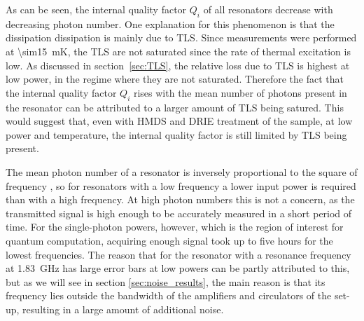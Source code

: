 As can be seen, the internal quality factor $Q_i$ of all resonators decrease with decreasing photon number. One explanation for this phenomenon is that the dissipation dissipation is mainly due to TLS. Since measurements were performed at \SI{\sim15}{mK}, the TLS are not saturated since the rate of thermal excitation is low. As discussed in section~\ref{sec:TLS}, the relative loss due to TLS is highest at low power, in the regime where they are not saturated. Therefore the fact that the internal quality factor $Q_i$ rises with the mean number of photons present in the resonator can be attributed to a larger amount of TLS being satured. This would suggest that, even with HMDS and DRIE treatment of the sample, at low power and temperature, the internal quality factor is still limited by TLS being present.

The mean photon number of a resonator is inversely proportional to the square of frequency \cite{bruno2015reducing}, so for resonators with a low frequency a lower input power is required than with a high frequency. At high photon numbers this is not a concern, as the transmitted signal is high enough to be accurately measured in a short period of time. For the single-photon powers, however, which is the region of interest for quantum computation, acquiring enough signal took up to five hours for the lowest frequencies. The reason that for the resonator with a resonance frequency at \SI{1.83}{\giga \hertz} has large error bars at low powers can be partly attributed to this, but as we will see in section \ref{sec:noise_results}, the main reason is that its frequency lies outside the bandwidth of the amplifiers and circulators of the set-up, resulting in a large amount of additional noise.






